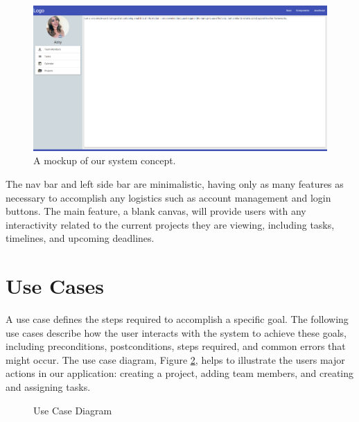 \FloatBarrier
\begin{figure}[ht]
\includegraphics[width=\textwidth]{mockup.png}
\caption{A mockup of our system concept.}
\label{mockup}
\end{figure}
\FloatBarrier

\par The nav bar and left side bar are minimalistic, having only as many features as necessary to accomplish any logistics such as account management and login buttons. The main feature, a blank canvas, will provide users with any interactivity related to the current projects they are viewing, including tasks, timelines, and upcoming deadlines. 

\section{Use Cases}
A use case defines the steps required to accomplish a specific goal. The following use cases describe how the user interacts with the system to achieve these goals, including preconditions, postconditions, steps required, and common errors that might occur. The use case diagram, Figure \ref{ucd}, helps to illustrate the user\textsc{}s major actions in our application: creating a project, adding team members, and creating and assigning tasks. 
\begin{figure}[ht]
\centering
{}
\caption{Use Case Diagram}
\label{ucd}
\end{figure}

